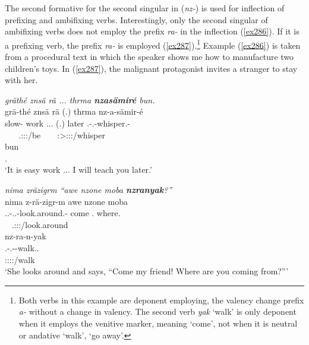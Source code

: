 The second formative for the second singular in  (\emph{nz-}) is used for  inflection of prefixing and ambifixing verbs. Interestingly, only the second  singular of ambifixing verbs does not employ the  prefix \emph{ra-} in the  inflection (\ref{ex286}). If it is a prefixing verb, the  prefix \emph{ra-} is employed (\ref{ex287}).\footnote{Both verbs in this example are deponent employing, the valency change prefix \emph{a-} without a change in valency. The second verb \emph{yak} `walk' is only deponent when it employs the venitive marker, meaning `come', not when it is neutral or andative `walk', `go away'.} Example (\ref{ex286}) is taken from a procedural text in which the speaker shows me how to manufacture two children's toys. In (\ref{ex287}), the malignant protagonist invites a stranger to stay with her.

\begin{exe}
	\ex \emph{gräthé znsä rä ... thrma \textbf{nzasämiré} bun.}\\
	\glll grä-thé znsä rä (.) thrma nz-a-sämir-é\\
	slow-{\Adlzr} work \Tsg.\F.\Cop.{\Ndu} (.) later \Ssg.\Bet-\Vc.\Ndu-whisper.\Rs-\Fsg{}\\
	~ ~ {\footnotesize \Tsg.\F:\Sbj:\Nonpast:\Ipfv/be} ~ ~ {\footnotesize \Fsg:\Sbj>\Ssg:\Io:\Irr:\Pfv/whisper}\\
	\sn
	\gll bun\\
	\Ssg.\Dat\\
	\trans `It is easy work ... I will teach you later.' 
	\label{ex286}
\end{exe}
\begin{exe}
	\ex \emph{nima zräzigrm ``awe nzone moba \textbf{nzranyak}?''}\\
	\glll nima z-rä-zigr-m awe nzone moba\\
	{\Quot} \Tsg.\F.\Bet-\Irr.\Vc.\Ndu-look.around.\Rs-\Dur{} come \Fsg.{\Poss} where.{\Abl}\\
	~ {\footnotesize \Tsg.\F:\Sbj:\Irr:\Pfv/look.around} ~ ~ ~\\
	\sn
	\glll nz-ra-n-yak\\
	\Ssg.\Bet-\Irr.\Vc-\Venit-walk.\Ext.\Ndu\\
	{\footnotesize \Ssg:\Sbj:\Irr:\Ipfv:\Venit/walk}\\
	\trans `She looks around and says, ``Come my friend! Where are you coming from?''' 
	\label{ex287}
\end{exe}

